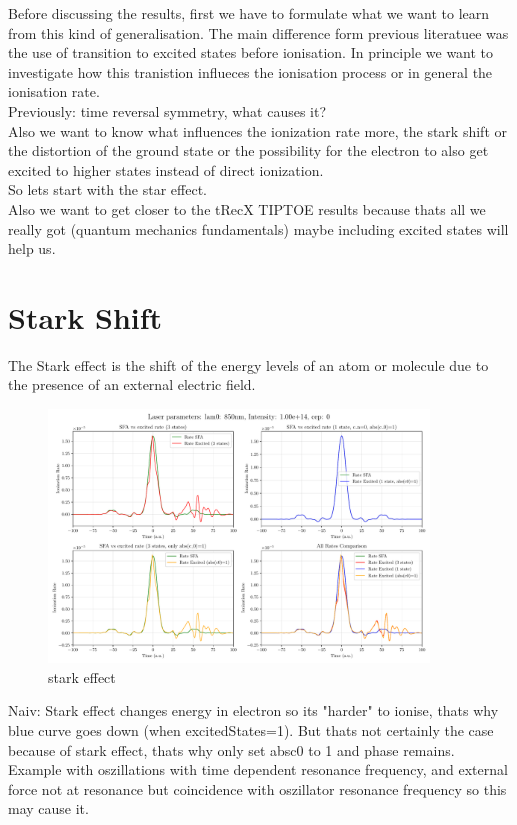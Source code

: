 Before discussing the results, first we have to formulate what we want to learn from this kind of generalisation. 
The main difference form previous literatuee was the use of transition to excited states before ionisation. 
In principle we want to investigate how this tranistion influeces the ionisation process or in general the ionisation rate.\\
Previously: time reversal symmetry, what causes it? \\
Also we want to know what influences the ionization rate more, the stark shift or the distortion of the ground state or the possibility for the electron to also get excited to higher states instead of direct ionization.\\
So lets start with the star effect.\\
Also we want to get closer to the tRecX TIPTOE results because thats all we really got (quantum mechanics fundamentals) maybe including excited states will help us.

\section{Stark Shift}
The Stark effect is the shift of the energy levels of an atom or molecule due to the presence of an external electric field.

\begin{figure}[H]
    \centering
    \includegraphics[width=0.9\textwidth]{figures/rate4_850_1.00e+14_onlystark.pdf}
    \caption{stark effect}
    \label{fig:starkeffect}
\end{figure}

Naiv: Stark effect changes energy in electron so its "harder" to ionise, thats why blue curve goes down (when excitedStates=1). 
But thats not certainly the case because of stark effect, thats why only set absc0 to 1 and phase remains. 
Example with oszillations with time dependent resonance frequency, and external force not at resonance but coincidence with oszillator resonance frequency so this may cause it.





